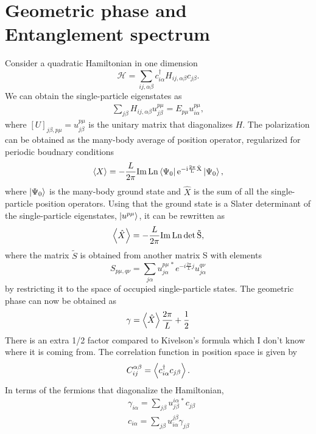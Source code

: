 \documentclass[twocolumn,amsmath,longbibliography,amssymb,superscriptaddress]{revtex4-1}
\newcommand{\carlos}[1]{{\color{red} #1}}
\begin{document}
\section{Geometric phase and Entanglement spectrum}
Consider a quadratic Hamiltonian in one dimension
\begin{equation}
\mathcal{H} = \sum_{ij,\alpha\beta} c_{i\alpha}^\dagger H_{ij,\alpha \beta}c_{j\beta}.
\end{equation}
We can obtain the single-particle eigenstates as
\begin{align*}
\sum_{j\beta}H_{ij,\alpha\beta} u^{p\mu}_{j\beta} = E_{p\mu} u_{i\alpha}^{p\mu},
\end{align*}
where $[U]_{j\beta,p\mu} = u^{p\mu}_{j\beta}$ is the unitary matrix that diagonalizes $H$. The polarization can be obtained as the many-body average of position operator, regularized for periodic boudnary conditions \cite{Resta1997}
\begin{align*}
\expval{X} = -\frac{L}{2\pi} \rm{ Im\, Ln }\bra{\Psi_0}e^{-i \frac{2\pi}{L}\hat{X}}\ket{\Psi_0},
\end{align*}
where $\ket{\Psi_0}$ is the many-body ground state and $\hat{X}$ is the sum of all the single-particle position operators.
Using that the ground state is a Slater determinant of the single-particle eigenstates, $\ket{u^{p\mu}}$, it can be rewritten as
\begin{align*}
\expval{\hat{X}} = -\frac{L}{2\pi} \rm{Im \, Ln}\, {\rm det} \, \tilde{S},
\end{align*}
where the matrix $\tilde{S}$ is obtained from another matrix S with elements
\begin{equation}
S_{p\mu,q\nu} = \sum_{j\alpha}u^{p\mu\, \ast}_{j \alpha} e^{-i\frac{2\pi}{L}j}u^{q\nu}_{j \alpha}
\end{equation}
by restricting it to the space of occupied single-particle states. The geometric phase can now be obtained as
\begin{equation}
\gamma = \expval{\hat{X}}\frac{2\pi}{L} + \frac{1}{2}
\end{equation}
\carlos{There is an extra 1/2 factor compared to Kivelson's formula which I don't know where it is coming from.}
The correlation function in position space is given by
\begin{align*}
C_{ij}^{\alpha \beta} = \expval{c_{i\alpha}^\dagger c_{j\beta}}.
\end{align*}
In terms of the fermions that diagonalize the Hamiltonian, 
\begin{align*}
& \gamma_{i\alpha} = \sum_{j\beta}u_{j\beta}^{i\alpha \, \ast} c_{j\beta} \\
& c_{i\alpha} = \sum_{j\beta} u^{j\beta}_{i\alpha} \gamma_{j\beta}
\end{align*}
\end{document}

